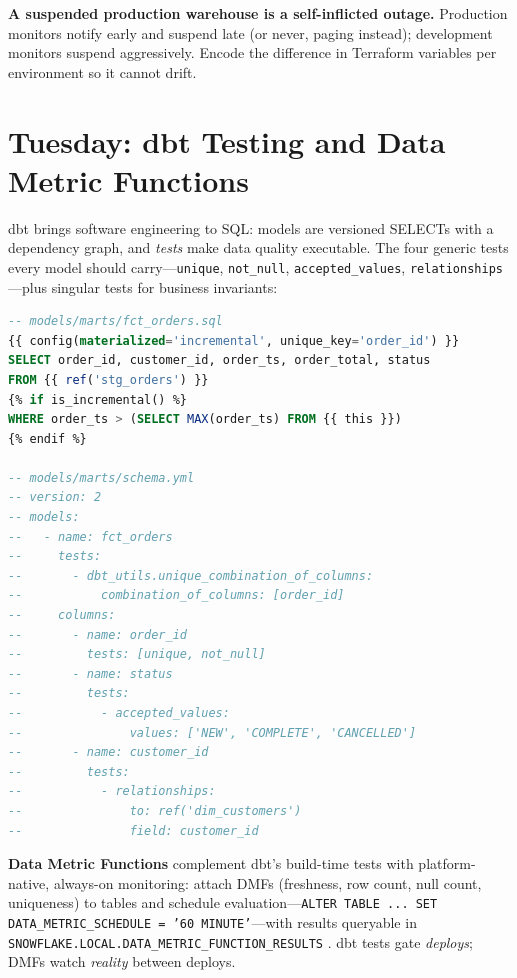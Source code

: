 \begin{pitfall}
\textbf{A suspended production warehouse is a self-inflicted outage.} Production monitors notify early and suspend late (or never, paging instead); development monitors suspend aggressively. Encode the difference in Terraform variables per environment so it cannot drift.
\end{pitfall}

\section{Tuesday: dbt Testing and Data Metric Functions}
dbt brings software engineering to SQL: models are versioned SELECTs with a dependency graph, and \emph{tests} make data quality executable. The four generic tests every model should carry---\texttt{unique}, \texttt{not\_null}, \texttt{accepted\_values}, \texttt{relationships}---plus singular tests for business invariants:

\begin{lstlisting}[language=SQL, caption={dbt incremental model plus schema.yml tests}]
-- models/marts/fct_orders.sql
{{ config(materialized='incremental', unique_key='order_id') }}
SELECT order_id, customer_id, order_ts, order_total, status
FROM {{ ref('stg_orders') }}
{% if is_incremental() %}
WHERE order_ts > (SELECT MAX(order_ts) FROM {{ this }})
{% endif %}

-- models/marts/schema.yml
-- version: 2
-- models:
--   - name: fct_orders
--     tests:
--       - dbt_utils.unique_combination_of_columns:
--           combination_of_columns: [order_id]
--     columns:
--       - name: order_id
--         tests: [unique, not_null]
--       - name: status
--         tests:
--           - accepted_values:
--               values: ['NEW', 'COMPLETE', 'CANCELLED']
--       - name: customer_id
--         tests:
--           - relationships:
--               to: ref('dim_customers')
--               field: customer_id
\end{lstlisting}

\textbf{Data Metric Functions} complement dbt's build-time tests with platform-native, always-on monitoring: attach DMFs (freshness, row count, null count, uniqueness) to tables and schedule evaluation---\texttt{ALTER TABLE ... SET DATA\_METRIC\_SCHEDULE = '60 MINUTE'}---with results queryable in \texttt{SNOWFLAKE.LOCAL.DATA\_METRIC\_FUNCTION\_RESULTS} \cite{snowflakeDmfDocs}. dbt tests gate \emph{deploys}; DMFs watch \emph{reality} between deploys.

